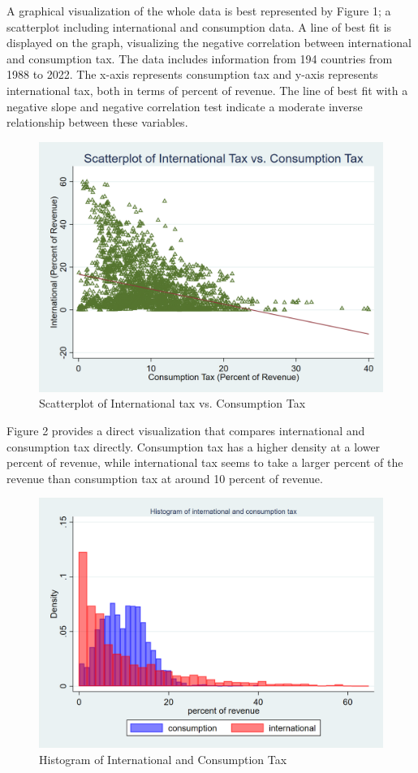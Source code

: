 \documentclass[12pt]{article}
\begin{document}
A graphical visualization of the whole data is best represented by Figure 1; a scatterplot including international and consumption data. A line of best fit is displayed on the graph, visualizing the negative correlation between international and consumption tax. The data includes information from 194 countries from 1988 to 2022. The x-axis represents consumption tax and y-axis represents international tax, both in terms of percent of revenue. The line of best fit with a negative slope and negative correlation test indicate a moderate inverse relationship between these variables. 

\begin{figure}[h]
    \centering
    \includegraphics[width=0.5\linewidth]{Reproducibility_Package//png_files/Scatterplotintvscons.png}
    \caption{Scatterplot of International tax vs. Consumption Tax}
    \label{fig:enter-label}
\end{figure}

Figure 2 provides a direct visualization that compares international and consumption tax directly. Consumption tax has a higher density at a lower percent of revenue, while international tax seems to take a larger percent of the revenue than consumption tax at around 10 percent of revenue. 

\begin{figure}[h]
    \centering
    \includegraphics[width=0.5\linewidth]{Reproducibility_Package//png_files/twowayhistintcons.png}
    \caption{Histogram of International and Consumption Tax}
    \label{fig:enter-label}
\end{figure}
\end{document}
